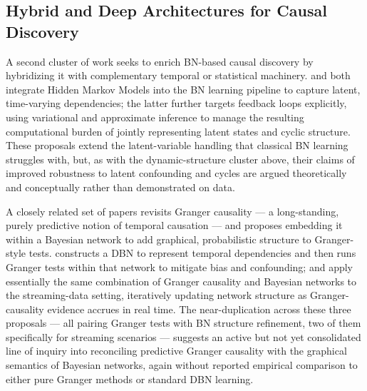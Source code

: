 \subsection{Hybrid and Deep Architectures for Causal Discovery}
A second cluster of work seeks to enrich BN-based causal discovery by hybridizing it with complementary temporal or statistical machinery. \cite{zhang2026causalf} and \cite{zhang2026causale} both integrate Hidden Markov Models into the BN learning pipeline to capture latent, time-varying dependencies; the latter further targets feedback loops explicitly, using variational and approximate inference to manage the resulting computational burden of jointly representing latent states and cyclic structure. These proposals extend the latent-variable handling that classical BN learning struggles with, but, as with the dynamic-structure cluster above, their claims of improved robustness to latent confounding and cycles are argued theoretically and conceptually rather than demonstrated on data.

A closely related set of papers revisits Granger causality --- a long-standing, purely predictive notion of temporal causation --- and proposes embedding it within a Bayesian network to add graphical, probabilistic structure to Granger-style tests. \cite{zhang2026causalm} constructs a DBN to represent temporal dependencies and then runs Granger tests within that network to mitigate bias and confounding; \cite{zhang2026causalr} and \cite{zhang2026causals} apply essentially the same combination of Granger causality and Bayesian networks to the streaming-data setting, iteratively updating network structure as Granger-causality evidence accrues in real time. The near-duplication across these three proposals --- all pairing Granger tests with BN structure refinement, two of them specifically for streaming scenarios --- suggests an active but not yet consolidated line of inquiry into reconciling predictive Granger causality with the graphical semantics of Bayesian networks, again without reported empirical comparison to either pure Granger methods or standard DBN learning.

